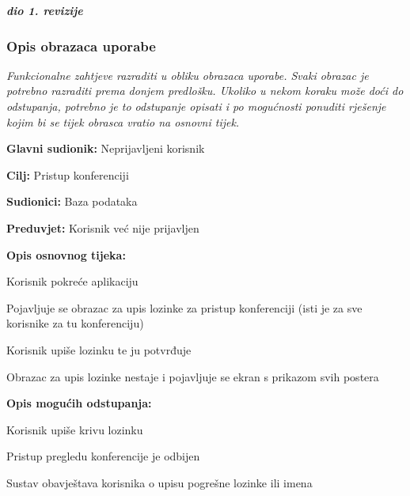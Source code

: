 				\textbf{\textit{dio 1. revizije}}
				
				\subsubsection{Opis obrazaca uporabe}
					\textit{Funkcionalne zahtjeve razraditi u obliku obrazaca uporabe. Svaki obrazac je potrebno razraditi prema donjem predlošku. Ukoliko u nekom koraku može doći do odstupanja, potrebno je to odstupanje opisati i po mogućnosti ponuditi rješenje kojim bi se tijek obrasca vratio na osnovni tijek.}\\
					
					\setcounter{UseCaseCounter}{1}
					
					\noindent {}
					\begin{packed_item}
	
						\item \textbf{Glavni sudionik: } Neprijavljeni korisnik
						\item  \textbf{Cilj:} Pristup konferenciji
						\item  \textbf{Sudionici:} Baza podataka
						\item  \textbf{Preduvjet:} Korisnik već nije prijavljen
						\item  \textbf{Opis osnovnog tijeka:}
						
						\item[] \begin{packed_enum}
	
							\item Korisnik pokreće aplikaciju
							\item Pojavljuje se obrazac za upis lozinke za pristup konferenciji (isti je za sve korisnike za tu konferenciju)
							\item Korisnik upiše lozinku te ju potvrđuje
							\item Obrazac za upis lozinke nestaje i pojavljuje se ekran s prikazom svih postera
						\end{packed_enum}
						
						\item  \textbf{Opis mogućih odstupanja:}
						
						\item[] \begin{packed_item}
	
							\item[3.a] Korisnik upiše krivu lozinku
							\item[] \begin{packed_enum}
								
								\item Pristup pregledu konferencije je odbijen
								\item Sustav obavještava korisnika o upisu pogrešne lozinke ili imena
								
							\end{packed_enum}
							
						\end{packed_item}
					\end{packed_item}
					
